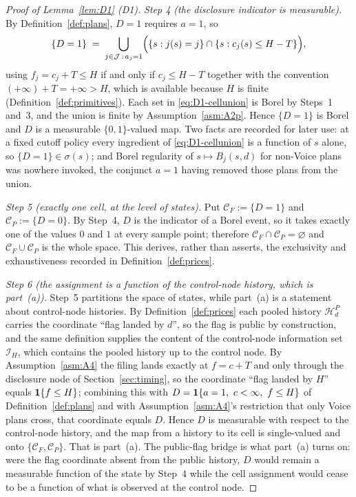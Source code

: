 \begin{proof}[Proof of Lemma~\ref{lem:D1} (D1)]
\emph{Step 4 (the disclosure indicator is measurable).} By Definition~\ref{def:plans}, $D=1$ requires
$a=1$, so
\begin{equation}
\label{eq:D1-cellunion}
\{D = 1\} \;=\; \bigcup_{j \in \mathcal J\,:\,a_j = 1}
  \Bigl( \{s : j(s) = j\} \cap \{s : c_j(s) \le H-T\} \Bigr),
\end{equation}
using $f_j = c_j + T \le H$ if and only if $c_j \le H-T$ together with the convention
$(+\infty)+T = +\infty > H$, which is available because $H$ is finite
(Definition~\ref{def:primitives}). Each set in \eqref{eq:D1-cellunion} is Borel by Steps~1 and~3, and
the union is finite by Assumption~\ref{asm:A2p}. Hence $\{D=1\}$ is Borel and $D$ is a measurable
$\{0,1\}$-valued map. Two facts are recorded for later use: at a fixed cutoff policy every ingredient
of \eqref{eq:D1-cellunion} is a function of $s$ alone, so $\{D=1\} \in \sigma(s)$; and Borel
regularity of $s \mapsto B_j(s,d)$ for non-Voice plans was nowhere invoked, the conjunct $a=1$ having
removed those plans from the union.

\emph{Step 5 (exactly one cell, at the level of states).} Put $\mathcal C_F := \{D=1\}$ and
$\mathcal C_P := \{D=0\}$. By Step~4, $D$ is the indicator of a Borel event, so it takes exactly one
of the values $0$ and $1$ at every sample point; therefore $\mathcal C_F \cap \mathcal C_P =
\varnothing$ and $\mathcal C_F \cup \mathcal C_P$ is the whole space. This derives, rather than
asserts, the exclusivity and exhaustiveness recorded in Definition~\ref{def:prices}.

\emph{Step 6 (the assignment is a function of the control-node history, which is part~(a)).} Step~5
partitions the space of states, while part~(a) is a statement about control-node histories. By
Definition~\ref{def:prices} each pooled history $\mathcal H_d^P$ carries the coordinate ``flag landed
by $d$'', so the flag is public by construction, and the same definition supplies the content of the
control-node information set $\mathcal I_H$, which contains the pooled history up to the control
node. By Assumption~\ref{asm:A4} the filing lands exactly at $f = c+T$ and only through the
disclosure node of Section~\ref{sec:timing}, so the coordinate ``flag landed by $H$'' equals
$\mathbf{1}\{f \le H\}$; combining this with $D = \mathbf{1}\{a=1,\ c<\infty,\ f \le H\}$ of
Definition~\ref{def:plans} and with Assumption~\ref{asm:A4}'s restriction that only Voice plans
cross, that coordinate equals $D$. Hence $D$ is measurable with respect to the control-node history,
and the map from a history to its cell is single-valued and onto
$\{\mathcal C_F,\mathcal C_P\}$. That is part~(a). The public-flag bridge is what part~(a) turns on:
were the flag coordinate absent from the public history, $D$ would remain a measurable function of
the state by Step~4 while the cell assignment would cease to be a function of what is observed at the
control node.


\end{proof}
